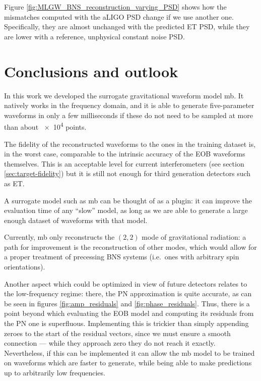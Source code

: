 \documentclass[main.tex]{subfiles}
\begin{document}
Figure \ref{fig:MLGW_BNS_reconstruction_varying_PSD} shows how the mismatches computed with the \ac{aLIGO} \ac{PSD} change if we use another one. 
Specifically, they are almost unchanged with the predicted \ac{ET} \ac{PSD}, while they are lower with a reference, unphysical constant noise \ac{PSD}.


\section{Conclusions and outlook}


In this work we developed the surrogate gravitational waveform model \ac{mb}.
It natively works in the frequency domain, and it is able to generate five-parameter waveforms in only a few milliseconds if these do not need to be sampled at more than about \num{e4} points. 

The fidelity of the reconstructed waveforms to the ones in the training dataset is, in the worst case, comparable to the intrinsic accuracy of the \ac{EOB} waveforms themselves. 
This is an acceptable level for current interferometers (see section \ref{sec:target-fidelity}) but it is still not enough for third generation detectors such as \ac{ET}. 

A surrogate model such as \ac{mb} can be thought of as a plugin: it can improve the evaluation time of any ``slow'' model, as long as we are able to generate a large enough dataset of waveforms with that model. 

Currently, \ac{mb} only reconstructs the \((2, 2)\) mode of gravitational radiation: a path for improvement is the reconstruction of other modes, which would allow for a proper treatment of precessing \ac{BNS} systems (i.e.\ ones with arbitrary spin orientations). 

Another aspect which could be optimized in view of future detectors relates to the low-frequency regime: there, the \ac{PN} approximation is quite accurate, as can be seen in figures \ref{fig:amp_residuals} and \ref{fig:phase_residuals}. 
Thus, there is a point beyond which evaluating the \ac{EOB} model and computing its residuals from the \ac{PN} one is superfluous. 
Implementing this is trickier than simply appending zeroes to the start of the residual vectors, since we must ensure a smooth connection --- while they approach zero they do not reach it exactly. 
Nevertheless, if this can be implemented it can allow the \ac{mb} model to be trained on waveforms which are faster to generate, while being able to make predictions up to arbitrarily low frequencies. 


\end{document}
